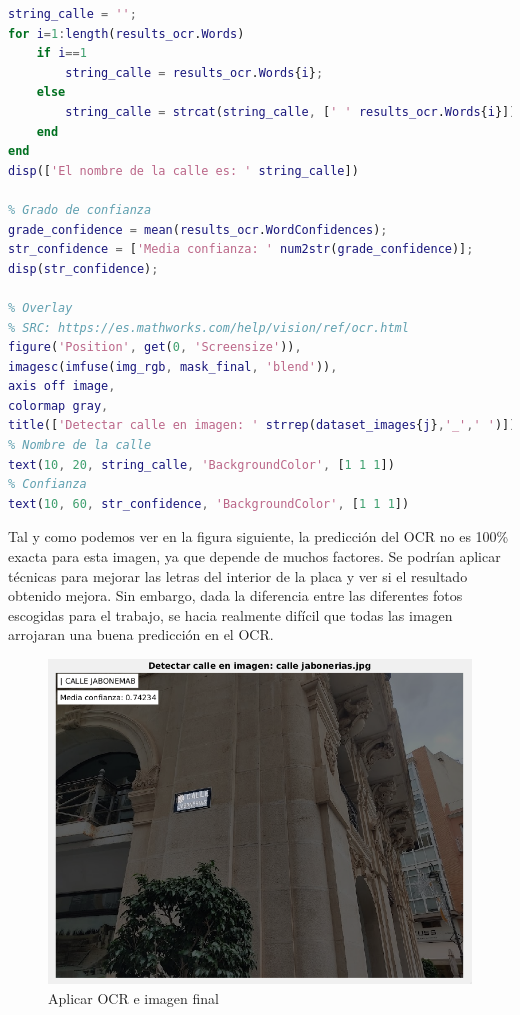 \documentclass[12pt]{article}
\begin{document}
\begin{enumerate}
\begin{lstlisting}[language=matlab, caption={Aplicar OCR e imagen final}]
% Obtenemos el texto del OCR
string_calle = '';
for i=1:length(results_ocr.Words)
	if i==1
		string_calle = results_ocr.Words{i};
	else
		string_calle = strcat(string_calle, [' ' results_ocr.Words{i}]);
	end
end
disp(['El nombre de la calle es: ' string_calle])

% Grado de confianza
grade_confidence = mean(results_ocr.WordConfidences);
str_confidence = ['Media confianza: ' num2str(grade_confidence)];
disp(str_confidence);

% Overlay
% SRC: https://es.mathworks.com/help/vision/ref/ocr.html
figure('Position', get(0, 'Screensize')),
imagesc(imfuse(img_rgb, mask_final, 'blend')),
axis off image,
colormap gray,
title(['Detectar calle en imagen: ' strrep(dataset_images{j},'_',' ')])
% Nombre de la calle
text(10, 20, string_calle, 'BackgroundColor', [1 1 1])
% Confianza
text(10, 60, str_confidence, 'BackgroundColor', [1 1 1])
		\end{lstlisting}
	
	\pagebreak
	
	\noindent Tal y como podemos ver en la figura siguiente, la predicción del OCR no es 100\% exacta para esta imagen, ya que depende de muchos factores. Se podrían aplicar técnicas para mejorar las letras del interior de la placa y ver si el resultado obtenido mejora. Sin embargo, dada la diferencia entre las diferentes fotos escogidas para el trabajo, se hacia realmente difícil que todas las imagen arrojaran una buena predicción en el OCR.
	
		\begin{figure}[h!]
			\begin{center}
				\includegraphics[width=1\textwidth]{img/impl_8.png}
				\caption{Aplicar OCR e imagen final}
				\label{img: ocr}
			\end{center}
		\end{figure}
	
	\end{enumerate}
\end{document}
